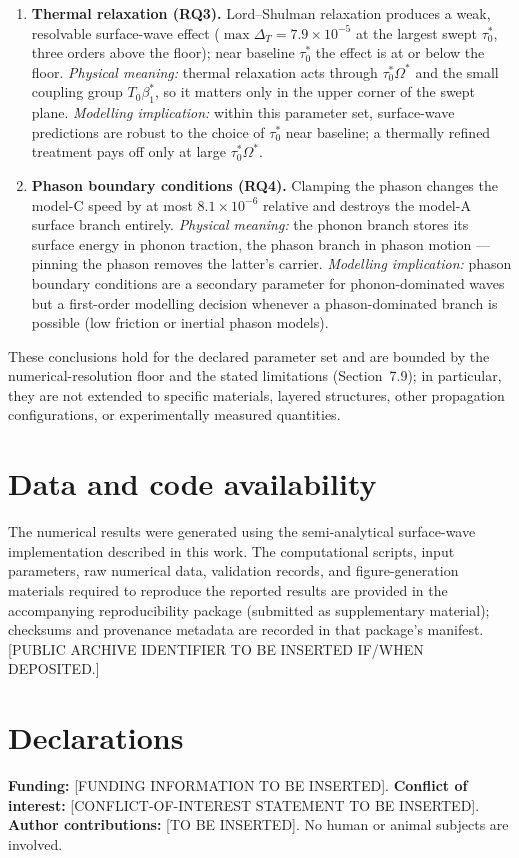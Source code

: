 \documentclass[11pt]{article}
\newcommand{\Om}{\Omega}
\begin{document}
\begin{enumerate}
\item \textbf{Thermal relaxation (RQ3).} Lord--Shulman relaxation produces a weak, resolvable surface-wave effect ($\max\Delta_T=7.9\times10^{-5}$ at the largest swept $\tau_0^*$, three orders above the floor); near baseline $\tau_0^*$ the effect is at or below the floor. \emph{Physical meaning:} thermal relaxation acts through $\tau_0^*\Om^*$ and the small coupling group $T_0\beta_1^*$, so it matters only in the upper corner of the swept plane. \emph{Modelling implication:} within this parameter set, surface-wave predictions are robust to the choice of $\tau_0^*$ near baseline; a thermally refined treatment pays off only at large $\tau_0^*\Om^*$.
\item \textbf{Phason boundary conditions (RQ4).} Clamping the phason changes the model-C speed by at most $8.1\times10^{-6}$ relative and destroys the model-A surface branch entirely. \emph{Physical meaning:} the phonon branch stores its surface energy in phonon traction, the phason branch in phason motion --- pinning the phason removes the latter's carrier. \emph{Modelling implication:} phason boundary conditions are a secondary parameter for phonon-dominated waves but a first-order modelling decision whenever a phason-dominated branch is possible (low friction or inertial phason models).
\end{enumerate}
These conclusions hold for the declared parameter set and are bounded by the numerical-resolution floor and the stated limitations (Section~7.9); in particular, they are not extended to specific materials, layered structures, other propagation configurations, or experimentally measured quantities.

\section*{Data and code availability}
The numerical results were generated using the semi-analytical surface-wave implementation described in this work. The computational scripts, input parameters, raw numerical data, validation records, and figure-generation materials required to reproduce the reported results are provided in the accompanying reproducibility package (submitted as supplementary material); checksums and provenance metadata are recorded in that package's manifest. [PUBLIC ARCHIVE IDENTIFIER TO BE INSERTED IF/WHEN DEPOSITED.]

\section*{Declarations}
{\sloppypar\noindent\textbf{Funding:} [FUNDING INFORMATION TO BE INSERTED]. \textbf{Conflict of interest:} [CONFLICT-OF-INTEREST STATEMENT TO BE INSERTED]. \textbf{Author contributions:} [TO BE INSERTED]. No human or animal subjects are involved.\par}
\end{document}
